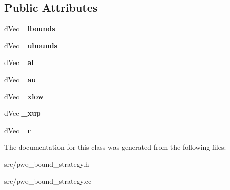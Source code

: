 \subsection*{Public Attributes}
\begin{DoxyCompactItemize}
\item 
\hypertarget{classlibcmaes_1_1pwqBoundStrategy_a960ccbcf7632359914d0b17797fcbcb9}{d\-Vec {\bfseries \-\_\-lbounds}}\label{classlibcmaes_1_1pwqBoundStrategy_a960ccbcf7632359914d0b17797fcbcb9}

\item 
\hypertarget{classlibcmaes_1_1pwqBoundStrategy_a60ab4a842e4be2b1381cb277fb704c71}{d\-Vec {\bfseries \-\_\-ubounds}}\label{classlibcmaes_1_1pwqBoundStrategy_a60ab4a842e4be2b1381cb277fb704c71}

\item 
\hypertarget{classlibcmaes_1_1pwqBoundStrategy_ac4191a379dea50cf65d7e10187e11b42}{d\-Vec {\bfseries \-\_\-al}}\label{classlibcmaes_1_1pwqBoundStrategy_ac4191a379dea50cf65d7e10187e11b42}

\item 
\hypertarget{classlibcmaes_1_1pwqBoundStrategy_adbc3f8447747aa8e69b9531de79102b5}{d\-Vec {\bfseries \-\_\-au}}\label{classlibcmaes_1_1pwqBoundStrategy_adbc3f8447747aa8e69b9531de79102b5}

\item 
\hypertarget{classlibcmaes_1_1pwqBoundStrategy_a14fcb2d8c35fe850f5eb50ef20b05078}{d\-Vec {\bfseries \-\_\-xlow}}\label{classlibcmaes_1_1pwqBoundStrategy_a14fcb2d8c35fe850f5eb50ef20b05078}

\item 
\hypertarget{classlibcmaes_1_1pwqBoundStrategy_a2b62aa7afd03d0c17311b67678bdfe8d}{d\-Vec {\bfseries \-\_\-xup}}\label{classlibcmaes_1_1pwqBoundStrategy_a2b62aa7afd03d0c17311b67678bdfe8d}

\item 
\hypertarget{classlibcmaes_1_1pwqBoundStrategy_a5f4b5a62672f381fdf8e25708e986152}{d\-Vec {\bfseries \-\_\-r}}\label{classlibcmaes_1_1pwqBoundStrategy_a5f4b5a62672f381fdf8e25708e986152}

\end{DoxyCompactItemize}


The documentation for this class was generated from the following files\-:\begin{DoxyCompactItemize}
\item 
src/pwq\-\_\-bound\-\_\-strategy.\-h\item 
src/pwq\-\_\-bound\-\_\-strategy.\-cc\end{DoxyCompactItemize}
